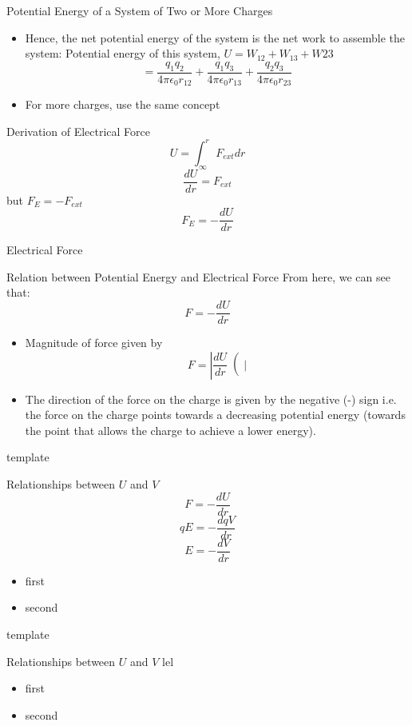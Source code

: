\documentclass{beamer}
\begin{document}
\begin{frame}{Potential Energy of a System of Two or More Charges}{}
  \begin{itemize}
  \item Hence, the net potential energy of the system is the net work to assemble the system:
Potential energy of this system, \(U=W_{12} + W_{13} + W{23} \)
\[=\frac{q_1 q_2}{4\pi \epsilon_0 r_{12}} + \frac{q_1 q_3}{4\pi \epsilon_0 r_{13}} + \frac{q_2 q_3}{4\pi \epsilon_0 r_{23}}\]
  \item For more charges, use the same concept
  \end{itemize}
\end{frame}


\begin{frame}{Derivation of Electrical Force}{}
\[U=\int_{\infty}^r F_{ext}dr\]
\[\frac{dU}{dr}=F_{ext}\]
but \(F_E = -F_{ext}\)
\[F_E=-\frac{dU}{dr}\] 
\end{frame}

\begin{frame}{Electrical Force}{}
\begin{block}{Relation between Potential Energy and Electrical Force}
From here, we can see that:
\[F=-\frac{dU}{dr}\]
\end{block}
  \begin{itemize}
  \item Magnitude of force given by
\[F=\left|\frac{dU}{dr}\right(|\]
  \item The direction of the force on the charge is given by the negative (-) sign i.e. the force on the charge points towards a decreasing potential energy (towards the point that allows the charge to achieve a lower energy).
  \end{itemize}
\end{frame}

\begin{frame}{template}{}
\begin{block}{Relationships between \(U\) and \(V\)}
\[F=-\frac{dU}{dr}\]
\[qE=-\frac{dqV}{dr}\]
\[E=-\frac{dV}{dr}\]

\end{block}
  \begin{itemize}
  \item first
  \item second
  \end{itemize}
\end{frame}


\begin{frame}{template}{}
\begin{block}{Relationships between \(U\) and \(V\)}
lel
\end{block}
  \begin{itemize}
  \item first
  \item second
  \end{itemize}
\end{frame}
\end{document}
